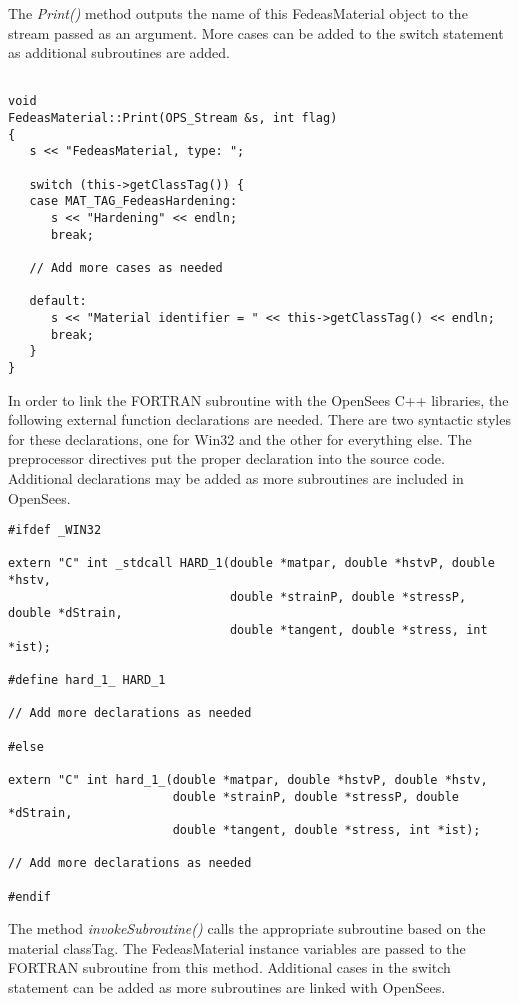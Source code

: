 \documentclass[12pt]{article}
\begin{document}
\noindent The {\em Print()} method outputs the name of this FedeasMaterial object to
the stream passed as an argument. More cases can be added to
the switch statement as additional subroutines are added.
    
{\sf\small
\begin{verbatim}

void
FedeasMaterial::Print(OPS_Stream &s, int flag)
{
   s << "FedeasMaterial, type: ";
           
   switch (this->getClassTag()) {
   case MAT_TAG_FedeasHardening:
      s << "Hardening" << endln;
      break;

   // Add more cases as needed
       
   default:
      s << "Material identifier = " << this->getClassTag() << endln;
      break;
   }
}
\end{verbatim}
}

\noindent In order to link the FORTRAN subroutine with the OpenSees C++ libraries, the
following external function declarations are needed. There are two syntactic styles for
these declarations, one for Win32 and the other for everything else. The preprocessor directives
put the proper declaration into the source code. Additional declarations may be added
as more subroutines are included in OpenSees.

{\sf\small
\begin{verbatim}
#ifdef _WIN32

extern "C" int _stdcall HARD_1(double *matpar, double *hstvP, double *hstv,
                               double *strainP, double *stressP, double *dStrain,
                               double *tangent, double *stress, int *ist);

#define hard_1_ HARD_1

// Add more declarations as needed

#else

extern "C" int hard_1_(double *matpar, double *hstvP, double *hstv,
                       double *strainP, double *stressP, double *dStrain,
                       double *tangent, double *stress, int *ist);

// Add more declarations as needed

#endif
\end{verbatim}
}

\noindent The method {\em invokeSubroutine()} calls the appropriate subroutine based
on the material classTag. The FedeasMaterial instance variables are passed to the
FORTRAN subroutine from this method. Additional cases in the switch statement can
be added as more subroutines are linked with OpenSees.
\end{document}
